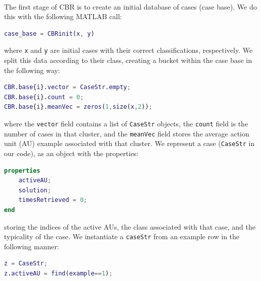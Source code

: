 \documentclass[a4paper,12pt,oneside,final]{report}
\newenvironment{changemargin}[2]{\begin{list}{}{%
\setlength{\topsep}{0pt}%
\setlength{\leftmargin}{0pt}%
\setlength{\rightmargin}{0pt}%
\setlength{\listparindent}{\parindent}%
\setlength{\itemindent}{\parindent}%
\setlength{\parsep}{0pt plus 1pt}%
\addtolength{\leftmargin}{#1}%
\addtolength{\rightmargin}{#2}%
}\item }{\end{list}}
\begin{document}
\paragraph{}
The first stage of CBR is to create an initial database of cases (case base).  We do this with the following MATLAB call:
\begin{changemargin}{-5mm}{-5mm}
\begin{lstlisting}[language=Matlab, frame=single]
case_base = CBRinit(x, y)
\end{lstlisting}
\end{changemargin}
where \verb+x+ and \verb+y+ are initial cases with their correct classifications, respectively.  We split this data according to their class, creating a bucket within the case base in the following way:
\begin{changemargin}{-5mm}{-5mm}
\begin{lstlisting}[language=Matlab, frame=single]
CBR.base{i}.vector = CaseStr.empty;
CBR.base{i}.count = 0;
CBR.base{i}.meanVec = zeros(1,size(x,2));
\end{lstlisting}
\end{changemargin}
where the \verb+vector+ field contains a list of \verb+CaseStr+ objects, the \verb+count+ field is the number of cases in that cluster, and the \verb+meanVec+ field stores the average action unit (AU) example associated with that cluster.  
We represent a case (\verb+CaseStr+ in our code), as an object with the properties:
\begin{changemargin}{-5mm}{-5mm}
\begin{lstlisting}[language=Matlab, frame=single]
properties
    activeAU;
    solution;
    timesRetrieved = 0;
end
\end{lstlisting}
\end{changemargin}
storing the indices of the active AUs, the class associated with that case, and the typicality of the case.  We instantiate a \verb+caseStr+ from an example row in the following manner:
\begin{changemargin}{-5mm}{-5mm}
\begin{lstlisting}[language=Matlab, frame=single]
z = CaseStr;
z.activeAU = find(example==1);
\end{lstlisting}
\end{changemargin}
\end{document}
